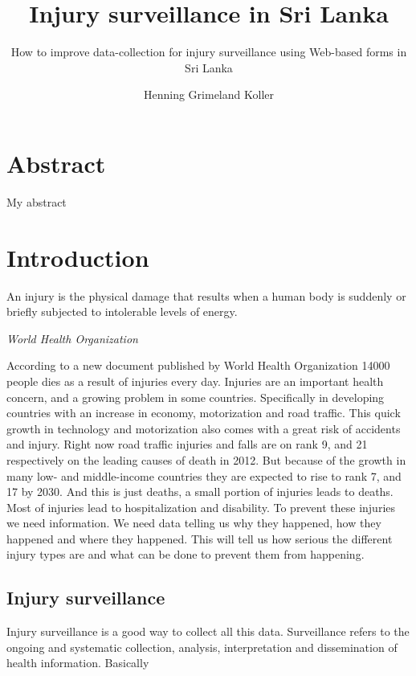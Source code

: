 \documentclass[UKenglish]{ifimaster}
\title{Injury surveillance in Sri Lanka}
\subtitle{How to improve data-collection for injury surveillance
using Web-based forms in Sri Lanka}
\author{Henning Grimeland Koller}
\newcommand{\WHO}{World Health Organization }
\begin{document}
\ififorside{}
\frontmatter{}
\maketitle{}

\chapter*{Abstract}
My abstract
\tableofcontents{}
\mainmatter{}

\chapter{Introduction}
\epigraph{
An injury is the physical damage that results when a human body is suddenly or briefly subjected to intolerable levels of energy.}{\textit{\WHO\cite{who-guide}}}

According to a new document published by \WHO\cite{who-article} 14000 people dies as a result of injuries every day.
Injuries are an important health concern, and a growing problem in some countries. Specifically in developing countries with an increase in economy, motorization and road traffic.
This quick growth in technology and motorization also comes with a great risk of accidents and injury.
Right now road traffic injuries and falls are on rank 9, and 21 respectively on the leading causes of death in 2012.\cite[4]{who-article} 
But because of the growth in many low- and middle-income countries they are expected to rise to rank 7, and 17 by 2030.
And this is just deaths, a small portion of injuries leads to deaths. Most of injuries lead to hospitalization and disability.
To prevent these injuries we need information. We need data telling us why they happened, how they happened and where they happened. 
This will tell us how serious the different injury types are and what can be done to prevent them from happening.

\section*{Injury surveillance}
Injury surveillance is a good way to collect all this data. Surveillance refers to the ongoing and systematic
collection, analysis, interpretation and dissemination of health information.\cite[11]{who-guide}
Basically 
\end{document}
